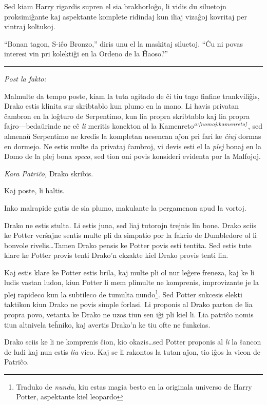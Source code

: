 Sed kiam Harry rigardis supren el sia brakhorloĝo, li vidis du
siluetojn proksimiĝante kaj aspektante komplete ridindaj kun iliaj
vizaĝoj kovritaj per vintraj koltukoj.

``Bonan tagon, S-iĉo Bronzo,'' diris unu el la maskitaj siluetoj. ``Ĉu
ni povas interesi vin pri kolektiĝi en la Ordeno de la Ĥaoso?''


\begin{center}\rule{3in}{0.4pt}\end{center}

\emph{Post la fakto:}

Malmulte da tempo poste, kiam la tuta agitado de ĉi tiu tago finfine
trankviliĝis, Drako estis klinita sur skribtablo kun plumo en la
mano. Li havis privatan ĉambron en la loĝturo de Serpentimo, kun lia
propra skribtablo kaj lia propra fajro—bedaŭrinde ne eĉ \emph{li}
meritis konekton al la Kamenreto$^{\textit{a:\ref{nomoj:kamenreto}}}$, sed almenaŭ
Serpentimo ne kredis la kompletan nesencan aĵon pri fari ke
\emph{ĉiuj} dormas en dormejo. Ne estis multe da privataj ĉambroj, vi
devis esti el la \emph{plej} bonaj en la Domo de la plej bona
\emph{speco}, sed tion oni povis konsideri evidenta por la Malfojoj.

\emph{Kara Patriĉo,} Drako skribis.

Kaj poste, li haltis.

Inko malrapide gutis de sia plumo, makulante la pergamenon apud la
vortoj.

Drako ne estis stulta. Li estis juna, sed liaj tutorojn trejnis lin
bone. Drako sciis ke Potter verŝajne sentis multe pli da simpatio por
la fakcio de Dumbledore ol li bonvole rivelis\ldots Tamen Drako pensis
ke Potter povis esti tentita. Sed estis tute klare ke Potter provis
tenti Drako'n ekzakte kiel Drako provis tenti lin.

Kaj estis klare ke Potter estis brila, kaj multe pli ol nur leĝere
freneza, kaj ke li ludis vastan ludon, kiun Potter li mem plimulte ne
komprenis, improvizante je la plej rapideco kun la subtileco de
tumulta nundo\footnote{Traduko de \emph{nundu}, kiu estas magia besto
  en la originala universo de Harry Potter, aspektante kiel
  leopardo}. Sed Potter sukcesis elekti taktikon kiun Drako ne povis
simple forlasi. Li proponis al Drako parton de lia propra povo,
vetanta ke Drako ne uzos tiun sen iĝi pli kiel li. Lia patriĉo nomis
tiun altnivela teĥniko, kaj avertis Drako'n ke tiu ofte ne funkcias.

Drako sciis ke li ne komprenis ĉion, kio okazis\ldots sed Potter
proponis al \emph{li} la ŝancon de ludi kaj nun estis \emph{lia}
vico. Kaj se li rakontos la tutan aĵon, tio iĝos la vicon de Patriĉo. 

